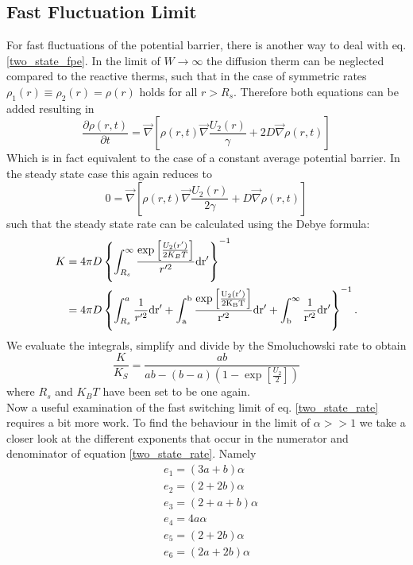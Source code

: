 \subsection{Fast Fluctuation Limit}
For fast fluctuations of the potential barrier, there is another way to deal with eq. \eqref{two_state_fpe}. In the limit of $W \rightarrow \infty$ the diffusion therm can be neglected compared to the reactive therms, such that in the case of symmetric rates $\rho_1(r) \equiv \rho_2(r) = \rho(r)$ holds for all $r>R_s$. Therefore both equations can be added resulting in 
\begin{equation}
    \frac{\partial \rho(r,t)}{\partial t} = \vec \nabla \left[\rho(r,t) \vec \nabla \frac{U_2(r)}{\gamma} + 2 D \vec \nabla \rho(r,t) \right]
    \label{fast_limit_fpe}
\end{equation}
Which is in fact equivalent to the case of a constant average potential barrier. In the steady state case this again reduces to
\begin{equation}
    0 = \vec \nabla \left[\rho(r,t) \vec \nabla \frac{U_2(r)}{2\gamma} + D \vec \nabla \rho(r,t) \right]
\end{equation}
such that the steady state rate can be calculated using the Debye formula:
\begin{align}
    K &=  4 \pi D \left\{\int_{R_s}^{\infty} \frac{\exp \left[ \frac{U_2(r')}{2 K_B T}\right]}{r'^2} \rm d r' \right\}^{-1} \nonumber \\
    &= 4 \pi D \left\{\int_{R_s}^{a} \frac{1}{r'^2} \rm d r' + \int_{a}^{b} \frac{\exp \left[ \frac{U_2(r')}{2K_B T}\right]}{r'^2} \rm d r' + \int_{b}^{\infty} \frac{1}{r'^2} \rm d r' \right\}^{-1}.
    \label{mean_potential_rate}
\end{align}
We evaluate the integrals, simplify and divide by the Smoluchowski rate to obtain
\begin{equation}
    \frac{K}{K_S} = \frac{ab}{ab - (b-a)(1-\exp\left[ \frac{U_2}{2} \right])}
    \label{K_fast_limit_false}
\end{equation}
where $R_s$ and $K_B T$ have been set to be one again. \\
Now a useful examination of the fast switching limit of eq. \eqref{two_state_rate} requires a bit more work.
To find the behaviour in the limit of $\alpha >>1$ we take a closer look at the different exponents that occur in the numerator and denominator of equation \eqref{two_state_rate}. Namely
\begin{align}
& e_1 = (3a+b)\alpha \nonumber \\
& e_2 = (2+2b)\alpha \nonumber \\
& e_3 = (2+a+b)\alpha \nonumber \\
& e_4 = 4a\alpha \nonumber \\
& e_5 = (2+2b)\alpha \nonumber \\
& e_6 = (2a+2b)\alpha
\end{align}
